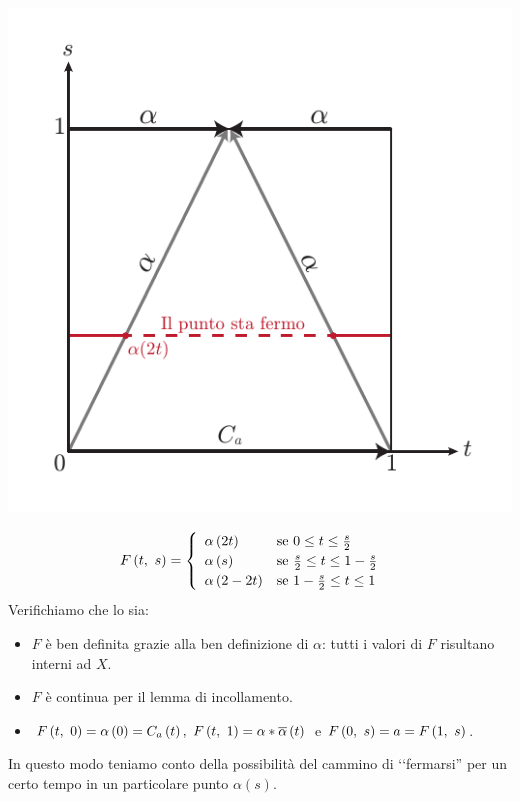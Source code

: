 \begin{demonstration}
\begin{enumerate}[label=\Roman*]
\begin{minipage}{.62\linewidth}
\end{minipage}
\begin{minipage}{.37\linewidth}
	\includegraphics[trim=0cm 0cm 0cm 0cm,clip,scale=0.6]{images/camminoinverso.pdf}
\end{minipage}
\begin{equation*}
	F\left(t,\ s\right)=\begin{cases}
		\begin{array}{ll}
			\alpha\left(2t\right)&\text{se }0\leq t\leq \frac{s}{2}\\
			\alpha\left(s\right)&\text{se }\frac{s}{2}\leq t\leq 1-\frac{s}{2}\\
			\alpha\left(2-2t\right)&\text{se }1-\frac{s}{2}\leq t\leq 1
		\end{array}
	\end{cases}
\end{equation*}
Verifichiamo che lo sia:
\begin{itemize}
\item $F$ è ben definita grazie alla ben definizione di $\alpha$: tutti i valori di $F$ risultano interni ad $X$.
\item $F$ è continua per il lemma di incollamento.
\item $\mvf{F}{t}{0}=\alpha\left(0\right)=C_a\left(t\right),\ \mvf{F}{t}{1}=\alpha\ast\overline{\alpha}\left(t\right)$ e $F\left(0,\ s\right)=a=F\left(1,\ s\right)$.
\end{itemize}
In questo modo teniamo conto della possibilità del cammino di ‘‘fermarsi'' per un certo tempo in un particolare punto $\alpha\left(s\right)$.
\end{enumerate}
\vspace{-3mm}
\end{demonstration}
